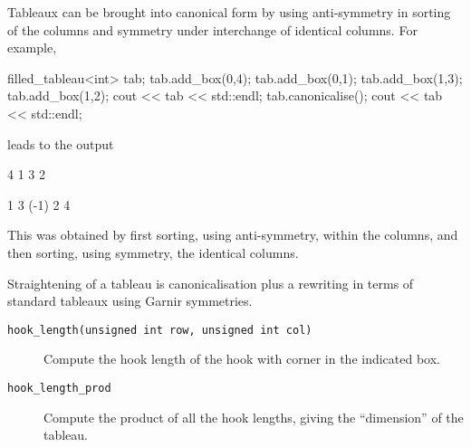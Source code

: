 \documentclass{kasper}
\begin{document}
\begin{sectionunit}
\begin{sectionunit}
Tableaux can be brought into canonical form by using anti-symmetry in
sorting of the columns and symmetry under interchange of identical
columns. For example,
\begin{screen}
filled_tableau<int> tab;
tab.add_box(0,4);
tab.add_box(0,1);
tab.add_box(1,3);
tab.add_box(1,2);
cout << tab << std::endl;
tab.canonicalise();
cout << tab << std::endl;
\end{screen}
leads to the output
\begin{screen}
4 1   
3 2

1 3  (-1)
2 4
\end{screen}
This was obtained by first sorting, using anti-symmetry, within the
columns, and then sorting, using symmetry, the identical columns.

Straightening of a tableau is canonicalisation plus a rewriting in
terms of standard tableaux using Garnir symmetries. 

\end{sectionunit}

\begin{description}
\item[{\tt hook\_length(unsigned int row, unsigned int col)}]
Compute the hook length of the hook with corner in the indicated box.
\item[{\tt hook\_length\_prod}] 
Compute the product of all the hook lengths, giving the ``dimension'' of 
the tableau.
\end{description}

\end{sectionunit}
\end{document}
